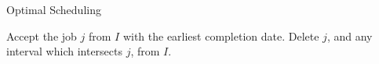 \begin{algorithm}
\caption{Optimal Scheduling}
\begin{algorithmic}
  \STATE Accept the job $j$ from $I$ with the earliest completion date.
  \STATE Delete $j$, and any interval which intersects $j$, from $I$.
\ENDWHILE
\ENDPROCEDURE
\end{algorithmic}
\end{algorithm}